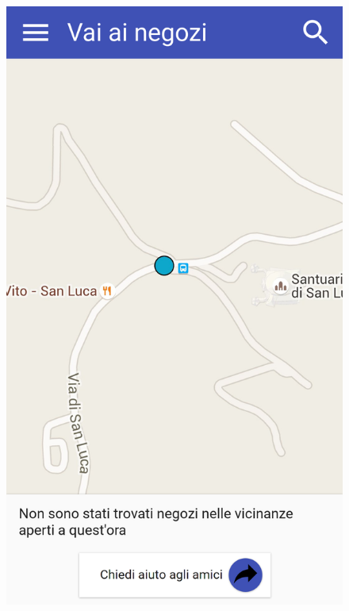 \begin{figure}[H]
	\begin{minipage}{.49\textwidth}
		\includegraphics[width=\textwidth]{img/wireframe/mappa_negozi_chiusi.png}
	\end{minipage}
		\begin{minipage}{.49\textwidth}

\end{minipage}
\end{figure}
